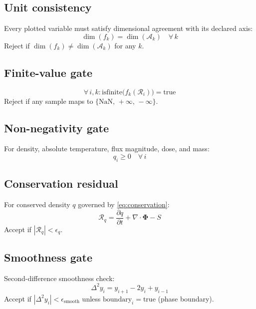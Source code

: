 \documentclass[11pt, a4paper, oneside]{article}
\newcommand{\Rec}{\mathcal{R}}           %
\newcommand{\Phivec}{\bm{\Phi}}
\begin{document}
\subsection{Unit consistency}

Every plotted variable must satisfy dimensional agreement with its declared
axis:
\begin{equation}
  \dim(f_k) = \dim(\mathcal{A}_k) \quad \forall\, k
  \label{eq:val_dim}
\end{equation}
Reject if $\dim(f_k) \neq \dim(\mathcal{A}_k)$ for any $k$.

\subsection{Finite-value gate}

\begin{equation}
  \forall\, i,k : \mathrm{isfinite}\bigl(f_k(\Rec_i)\bigr) = \mathrm{true}
  \label{eq:val_finite}
\end{equation}
Reject if any sample maps to $\{\mathrm{NaN},\, +\infty,\, -\infty\}$.

\subsection{Non-negativity gate}

For density, absolute temperature, flux magnitude, dose, and mass:
\begin{equation}
  q_i \geq 0 \quad \forall\, i
  \label{eq:val_nonneg}
\end{equation}

\subsection{Conservation residual}

For conserved density $q$ governed by \eqref{eq:conservation}:
\begin{equation}
  \mathcal{R}_q = \frac{\partial q}{\partial t} + \nabla\cdot\Phivec - S
  \label{eq:val_conservation}
\end{equation}
Accept if $|\mathcal{R}_q| < \epsilon_q$.

\subsection{Smoothness gate}
\label{sec:val_smooth}

Second-difference smoothness check:
\begin{equation}
  \Delta^2 y_i = y_{i+1} - 2y_i + y_{i-1}
  \label{eq:val_smooth}
\end{equation}
Accept if $|\Delta^2 y_i| < \epsilon_{\mathrm{smooth}}$ unless
$\mathrm{boundary}_i = \mathrm{true}$ (phase boundary).
\end{document}
